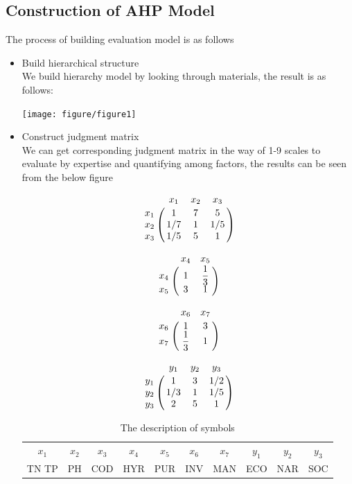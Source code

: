 \documentclass[12pt,a4paper]{article}
\begin{document}
\subsection{Construction of AHP Model}
The process of building evaluation model is as follows
\begin{itemize}
    \item Build hierarchical structure \\
    We build hierarchy model by looking through materials, the result is as follows:

    \parbox{\linewidth}{\centering\texttt{[image: figure/figure1]}\\
}
    \item Construct judgment matrix \\
    We can get corresponding judgment matrix in the way of 1-9 scales to evaluate by expertise and quantifying among factors, the results can be seen from the below figure   
    
\begin{equation}\bordermatrix{
    ~&x_1&x_2&x_3\cr
    x_1&1&7&5\cr
    x_2&1/7&1&1/5\cr
    x_3&1/5&5&1}
\end{equation}

\begin{equation}
\bordermatrix{
    ~&x_4&x_5\cr
    x_4&1&\dfrac{1}{3}\cr
    x_5&3&1}
\end{equation}


\begin{equation}
\bordermatrix{
    ~&x_6&x_7\cr
    x_6&1&3\cr
    x_7&\dfrac{1}{3}&1}
\end{equation}


\begin{equation}
\bordermatrix{
    ~&y_1&y_2&y_3\cr
    y_1&1&3&1/2\cr
    y_2&1/3&1&1/5\cr
    y_3&2&5&1}
\end{equation}


\begin{table}[H] \renewcommand\arraystretch{1.5}
    \begin{center}
        \begin{footnotesize}
            \begin{tabular}{cccccccccc}  \hline
                $x_1$&$x_2$&$x_3$ &$x_4$&   $x_5$&$x_6$&$x_7$&$y_1$&$y_2$&$y_3$\\
                TN TP&PH   &COD   & HYR &PUR&INV&MAN&ECO&NAR&SOC \\ \hline
            \end{tabular}
        \end{footnotesize}
        \caption{\footnotesize {The description of symbols}}
    \end{center}
\end{table}


\end{itemize}
\end{document}
